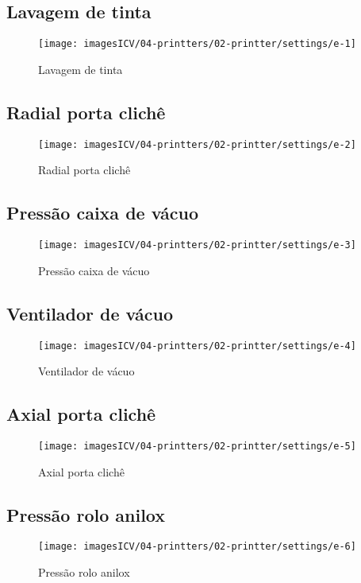 \usepackage{graphicx}
\newpage
\thispagestyle{fancy}
\vspace{\fill}

\subsection{Lavagem de tinta}
\begin{figure}
    \centering
    \texttt{[image: imagesICV/04-printters/02-printter/settings/e-1]}
    \caption{Lavagem de tinta}
\end{figure}
\newpage
\thispagestyle{fancy}
\vspace{\fill}

\subsection{Radial porta clichê}
\begin{figure}
    \centering
    \texttt{[image: imagesICV/04-printters/02-printter/settings/e-2]}
    \caption{Radial porta clichê}
\end{figure}
\newpage
\thispagestyle{fancy}
\vspace{\fill}

\subsection{Pressão caixa de vácuo}
\begin{figure}
    \centering
    \texttt{[image: imagesICV/04-printters/02-printter/settings/e-3]}
    \caption{Pressão caixa de vácuo}
\end{figure}
\newpage
\thispagestyle{fancy}
\vspace{\fill}

\subsection{Ventilador de vácuo}
\begin{figure}
    \centering
    \texttt{[image: imagesICV/04-printters/02-printter/settings/e-4]}
    \caption{Ventilador de vácuo}
\end{figure}
\newpage
\thispagestyle{fancy}
\vspace{\fill}

\subsection{Axial porta clichê}
\begin{figure}
    \centering
    \texttt{[image: imagesICV/04-printters/02-printter/settings/e-5]}
    \caption{Axial porta clichê}
\end{figure}
\newpage
\thispagestyle{fancy}
\vspace{\fill}

\subsection{Pressão rolo anilox}
\begin{figure}
    \centering
    \texttt{[image: imagesICV/04-printters/02-printter/settings/e-6]}
    \caption{Pressão rolo anilox}
\end{figure}
